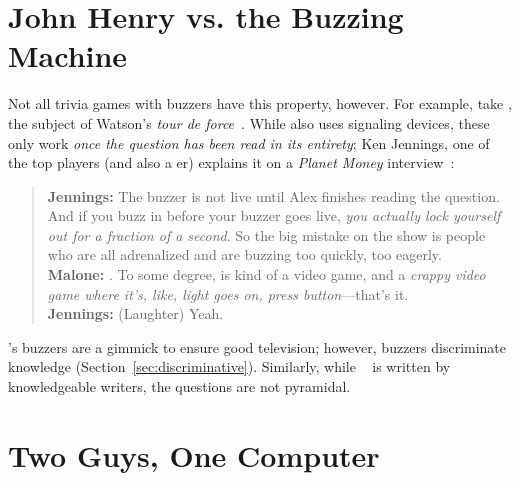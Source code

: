 \section{John Henry vs. the Buzzing Machine}

Not all trivia games with buzzers have this property, however.
For example, take \jeopardy{}, the subject of Watson's \textit{tour de force}~\cite{ferruci-10}.
While \jeopardy{} also uses signaling devices, these only work \emph{once the question has been read in its entirety}; Ken Jennings, one of the top \jeopardy{} players (and also a \qb{}er) explains it on a \textit{Planet Money} interview~\cite{malone-19}:
\begin{quote}
{\bf Jennings:} The buzzer is
    not live until Alex finishes reading the question. And if you buzz
    in before your buzzer goes live, \emph{you actually lock yourself out
    for a fraction of a second}. So the big mistake on the show is
    people who are all adrenalized and are buzzing too quickly, too
    eagerly. \\
{\bf Malone:} . To some degree, \jeopardy{} is kind of a video game, and a \emph{crappy video game where it's, like, light goes on, press button}---that's it. \\
{\bf Jennings:} (Laughter) Yeah. \\
\end{quote}
\jeopardy{}'s buzzers are a gimmick to ensure good television; however, \qb{} buzzers discriminate knowledge (Section~\ref{sec:discriminative}).
Similarly, while \triviaqa{}~\cite{joshi-17} is written by knowledgeable writers, the questions are not pyramidal.

\section{Two Guys, One Computer}


\section{}
